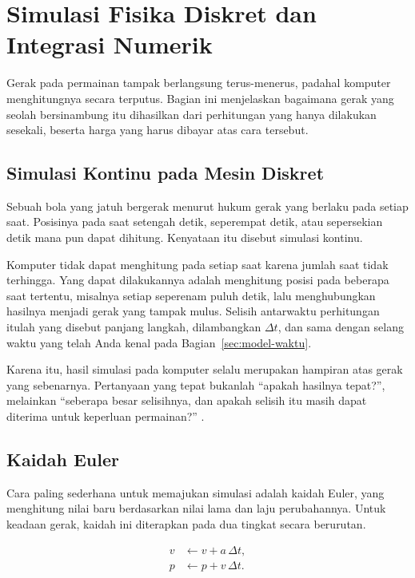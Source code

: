 \section{Simulasi Fisika Diskret dan Integrasi Numerik}
\label{sec:simulasi-diskret}

Gerak pada permainan tampak berlangsung terus-menerus, padahal komputer
menghitungnya secara terputus. Bagian ini menjelaskan bagaimana gerak yang
seolah bersinambung itu dihasilkan dari perhitungan yang hanya dilakukan
sesekali, beserta harga yang harus dibayar atas cara tersebut.

\subsection{Simulasi Kontinu pada Mesin Diskret}

Sebuah bola yang jatuh bergerak menurut hukum gerak yang berlaku pada setiap
saat. Posisinya pada saat setengah detik, seperempat detik, atau sepersekian
detik mana pun dapat dihitung. Kenyataan itu disebut simulasi kontinu.

Komputer tidak dapat menghitung pada setiap saat karena jumlah saat tidak
terhingga. Yang dapat dilakukannya adalah menghitung posisi pada beberapa saat
tertentu, misalnya setiap seperenam puluh detik, lalu menghubungkan hasilnya
menjadi gerak yang tampak mulus. Selisih antarwaktu perhitungan itulah yang
disebut panjang langkah, dilambangkan $\Delta t$, dan sama dengan selang waktu
yang telah Anda kenal pada Bagian~\ref{sec:model-waktu}.

Karena itu, hasil simulasi pada komputer selalu merupakan hampiran atas gerak
yang sebenarnya. Pertanyaan yang tepat bukanlah ``apakah hasilnya tepat?'',
melainkan ``seberapa besar selisihnya, dan apakah selisih itu masih dapat
diterima untuk keperluan permainan?'' \cite{catto-integration}.

\subsection{Kaidah Euler}

Cara paling sederhana untuk memajukan simulasi adalah kaidah Euler, yang
menghitung nilai baru berdasarkan nilai lama dan laju perubahannya. Untuk
keadaan gerak, kaidah ini diterapkan pada dua tingkat secara berurutan.

\begin{align}
v &\leftarrow v + a\,\Delta t, \label{eq:euler-v}\\
p &\leftarrow p + v\,\Delta t. \label{eq:euler-p}
\end{align}

